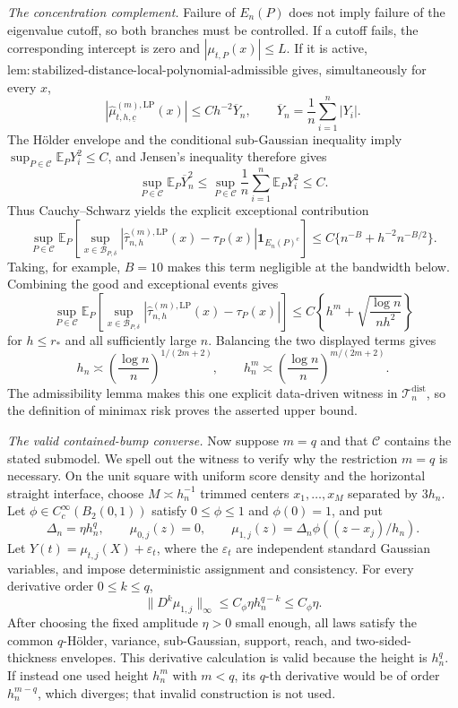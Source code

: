 \emph{The concentration complement.}
Failure of \(E_n(P)\) does not imply failure of the eigenvalue cutoff, so both branches must be controlled.  If a cutoff fails, the corresponding intercept is zero and \(|\mu_{t,P}(x)|\leq L\).  If it is active, \(\mathrm{lem:stabilized\text{-}distance\text{-}local\text{-}polynomial\text{-}admissible}\) gives, simultaneously for every \(x\),
\[
 \left|\widehat\mu^{(m),\mathrm{LP}}_{t,h,\underline c}(x)\right|
 \leq C h^{-2}\overline Y_n,
 \qquad \overline Y_n=\frac1n\sum_{i=1}^n|Y_i|.
\]
The H\"older envelope and the conditional sub-Gaussian inequality imply \(\sup_{P\in\mathcal C}\mathbb E_PY_i^2\leq C\), and Jensen's inequality therefore gives
\[
 \sup_{P\in\mathcal C}\mathbb E_P\overline Y_n^2
 \leq\sup_{P\in\mathcal C}\frac1n\sum_{i=1}^n\mathbb E_PY_i^2
 \leq C.
\]
Thus Cauchy--Schwarz yields the explicit exceptional contribution
\[
 \sup_{P\in\mathcal C}
 \mathbb E_P\!\left[
 \sup_{x\in\mathcal B_{P,\delta}}
 |\widehat\tau^{(m),\mathrm{LP}}_{n,h}(x)-\tau_P(x)|
 \mathbf1_{E_n(P)^c}
 \right]
 \leq C\{n^{-B}+h^{-2}n^{-B/2}\}.
\]
Taking, for example, \(B=10\) makes this term negligible at the bandwidth below.  Combining the good and exceptional events gives
\[
 \sup_{P\in\mathcal C}\mathbb E_P\!\left[
 \sup_{x\in\mathcal B_{P,\delta}}
 |\widehat\tau^{(m),\mathrm{LP}}_{n,h}(x)-\tau_P(x)|
 \right]
 \leq C\left\{h^m+\sqrt{\frac{\log n}{nh^2}}\right\}
\]
for \(h\leq r_*\) and all sufficiently large \(n\).  Balancing the two displayed terms gives
\[
 h_n\asymp\left(\frac{\log n}{n}\right)^{1/(2m+2)},
 \qquad
 h_n^m\asymp\left(\frac{\log n}{n}\right)^{m/(2m+2)}.
\]
The admissibility lemma makes this one explicit data-driven witness in \(\mathcal T_n^{\mathrm{dist}}\), so the definition of minimax risk proves the asserted upper bound.

\emph{The valid contained-bump converse.}
Now suppose \(m=q\) and that \(\mathcal C\) contains the stated submodel.  We spell out the witness to verify why the restriction \(m=q\) is necessary.  On the unit square with uniform score density and the horizontal straight interface, choose \(M\asymp h_n^{-1}\) trimmed centers \(x_1,\ldots,x_M\) separated by \(3h_n\).  Let \(\phi\in C_c^\infty(B_2(0,1))\) satisfy \(0\leq\phi\leq1\) and \(\phi(0)=1\), and put
\[
 \Delta_n=\eta h_n^q,
 \qquad
 \mu_{0,j}(z)=0,
 \qquad
 \mu_{1,j}(z)=\Delta_n\phi((z-x_j)/h_n).
\]
Let \(Y(t)=\mu_{t,j}(X)+\varepsilon_t\), where the \(\varepsilon_t\) are independent standard Gaussian variables, and impose deterministic assignment and consistency.  For every derivative order \(0\leq k\leq q\),
\[
 \|D^k\mu_{1,j}\|_\infty
 \leq C_\phi\eta h_n^{q-k}\leq C_\phi\eta.
\]
After choosing the fixed amplitude \(\eta>0\) small enough, all laws satisfy the common \(q\)-H\"older, variance, sub-Gaussian, support, reach, and two-sided-thickness envelopes.  This derivative calculation is valid because the height is \(h_n^q\).  If instead one used height \(h_n^m\) with \(m<q\), its \(q\)-th derivative would be of order \(h_n^{m-q}\), which diverges; that invalid construction is not used.

